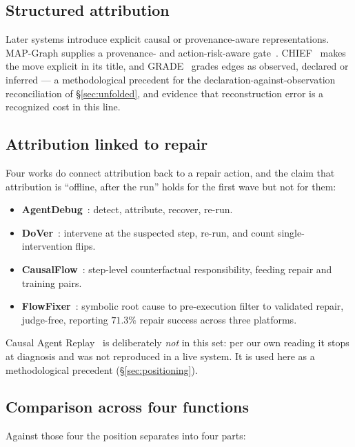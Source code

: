 \subsection*{Structured attribution}

Later systems introduce explicit causal or provenance-aware representations.
MAP-Graph supplies a provenance- and action-risk-aware gate~\cite{mapgraph}. CHIEF~\cite{chief}
makes the move explicit in its title, and GRADE~\cite{grade} grades edges
as observed, declared or inferred --- a methodological precedent for the
declaration-against-observation reconciliation of \S\ref{sec:unfolded},
and evidence that reconstruction error is a recognized cost in this line.

\subsection*{Attribution linked to repair}

Four works do connect attribution back to a repair action, and the claim
that attribution is ``offline, after the run'' holds for the first wave but
not for them:

\begin{itemize}
  \item \textbf{AgentDebug}~\cite{agentdebug}: detect, attribute, recover,
        re-run.
  \item \textbf{DoVer}~\cite{dover}: intervene at the suspected step,
        re-run, and count single-intervention flips.
  \item \textbf{CausalFlow}~\cite{causalflow}: step-level counterfactual
        responsibility, feeding repair and training pairs.
  \item \textbf{FlowFixer}~\cite{flowfixer}: symbolic root cause to
        pre-execution filter to validated repair, judge-free, reporting
        $71.3\%$ repair success across three platforms.
\end{itemize}

Causal Agent Replay~\cite{car} is deliberately \emph{not} in this set: per
our own reading it stops at diagnosis and was not reproduced in a live
system. It is used here as a methodological precedent
(\S\ref{sec:positioning}).

\subsection*{Comparison across four functions}

Against those four the position separates into four parts:


